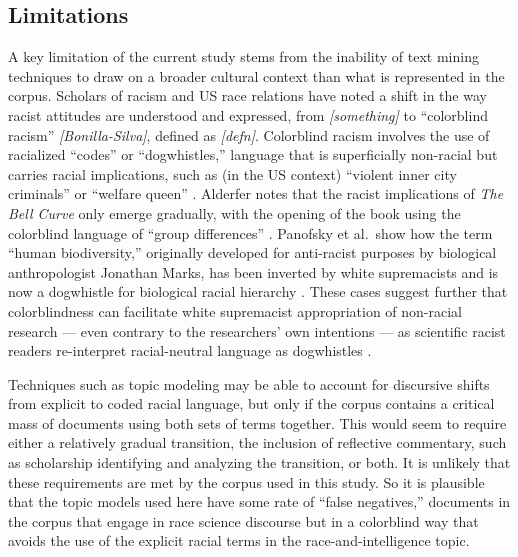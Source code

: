 \documentclass[12pt]{article}
\begin{document}
\hypertarget{limitations}{%
\subsection{Limitations}\label{limitations}}

A key limitation of the current study stems from the inability of text mining techniques to draw on a broader cultural context than what is represented in the corpus. Scholars of racism and US race relations have noted a shift in the way racist attitudes are understood and expressed, from \emph{{[}something{]}} to ``colorblind racism'' \emph{{[}Bonilla-Silva{]}}, defined as \emph{{[}defn{]}}. Colorblind racism involves the use of racialized ``codes'' or ``dogwhistles,'' language that is superficially non-racial but carries racial implications, such as (in the US context) ``violent inner city criminals'' or ``welfare queen'' \cite{SaulDogwhistlesPoliticalManipulation2018}. Alderfer notes that the racist implications of \emph{The Bell Curve} only emerge gradually, with the opening of the book using the colorblind language of ``group differences'' \cite{AlderferScienceNonsciencePsychologists2003}. Panofsky et al.~show how the term ``human biodiversity,'' originally developed for anti-racist purposes by biological anthropologist Jonathan Marks, has been inverted by white supremacists and is now a dogwhistle for biological racial hierarchy \cite{PanofskyHowWhiteNationalists2021}. These cases suggest further that colorblindness can facilitate white supremacist appropriation of non-racial research --- even contrary to the researchers' own intentions --- as scientific racist readers re-interpret racial-neutral language as dogwhistles \cite{GillbornSoftlySoftlyGenetics2016, WillsAreClustersRaces2017}.

Techniques such as topic modeling may be able to account for discursive shifts from explicit to coded racial language, but only if the corpus contains a critical mass of documents using both sets of terms together. This would seem to require either a relatively gradual transition, the inclusion of reflective commentary, such as scholarship identifying and analyzing the transition, or both. It is unlikely that these requirements are met by the corpus used in this study. So it is plausible that the topic models used here have some rate of ``false negatives,'' documents in the corpus that engage in race science discourse but in a colorblind way that avoids the use of the explicit racial terms in the race-and-intelligence topic.
\end{document}

